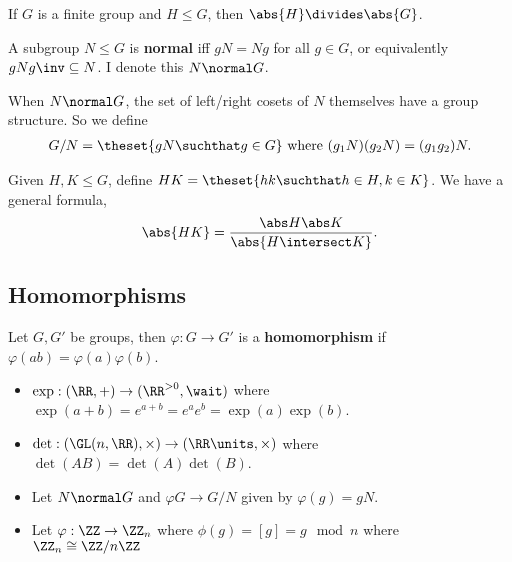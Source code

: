 
If \(G\) is a finite group and \(H \leq G\), then
\(\abs{H} \divides \abs{G}\). 


A subgroup \(N \leq G\) is \textbf{normal} iff \(gN = Ng\) for all
\(g\in G\), or equivalently \(gNg\inv \subseteq N\). I denote this
\(N \normal G\).


When \(N \normal G\), the set of left/right cosets of \(N\) themselves
have a group structure. So we define
\begin{align*}G/N = \theset{gN \suchthat g\in G} \text{ where } (g_1 N)(g_2 N) = (g_1 g_2) N.
\end{align*}

Given \(H, K \leq G\), define
\(HK = \theset{hk \suchthat h\in H, k\in K}\). We have a general
formula,
\begin{align*}
\abs{HK} = \frac{\abs H \abs K}{\abs{H \intersect K}}.
\end{align*}

\hypertarget{homomorphisms}{%
\subsection{Homomorphisms}\label{homomorphisms}}


Let \(G,G'\) be groups, then \(\varphi: G \to G'\) is a
\textbf{homomorphism} if \(\varphi(ab) = \varphi(a) \varphi(b)\).


\begin{itemize}
\tightlist
\item
  \(\exp: (\RR, +) \to (\RR^{> 0}, \wait)\) where
  \(\exp(a+b) = e^{a+b} = e^a e^b = \exp(a) \exp(b)\).
\item
  \(\det: (\GL(n, \RR), \times) \to (\RR\units, \times)\) where
  \(\det(AB) = \det(A) \det(B)\).
\item
  Let \(N \normal G\) and \(\varphi G \to G/N\) given by
  \(\varphi(g) = gN\).
\item
  Let \(\varphi: \ZZ \to \ZZ_n\) where \(\phi(g) = [g] = g \mod n\)
  where \(\ZZ_n \cong \ZZ/n\ZZ\)
\end{itemize}



